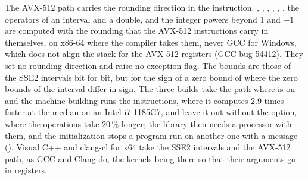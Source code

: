 \medskip
The AVX-512 path carries the rounding direction in the
instruction.\newinvfive{} , , ,
, , , the operators of an interval and
a double, and the integer powers beyond 1 and $-1$ are computed with the
rounding that the AVX-512 instructions carry in themselves, on x86-64 where
the compiler takes them, never GCC for Windows, which does not align the
stack for the AVX-512 registers (GCC bug 54412). They set no rounding
direction and raise no exception flag. The bounds are those of the SSE2
intervals bit for bit, but for the sign of a zero bound of 
where the zero bounds of the interval differ in sign. The three builds take
the path where  is on and the machine building
runs the instructions, where it computes 2.9 times faster at the median on an
Intel i7-1185G7, and leave it out without the option, where the operations take
20\,\% longer;
the library then needs a processor with them, and the initialization stops a
program run on another one with a message (). Visual C++
and clang-cl for x64 take the SSE2 intervals and the AVX-512 path, as GCC and
Clang do, the kernels being  there so that their
 arguments go in registers.

